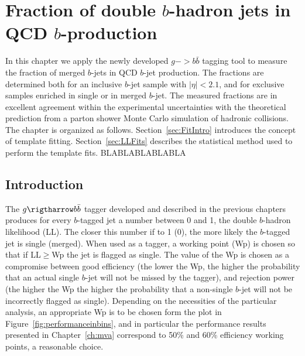 %
\chapter{Fraction of double $b$-hadron jets in QCD $b$-production}\label{ch:gbbfraction}


In this chapter we apply the newly developed $g->b\bar{b}$ tagging tool to measure the fraction of merged $b$-jets in QCD $b$-jet production. The fractions are determined both for an inclusive $b$-jet sample with $|\eta|<2.1$, and for exclusive samples enriched in single or in merged $b$-jet.
The measured fractions are in excellent agreement within the experimental uncertainties with the theoretical prediction from a parton shower Monte Carlo simulation of hadronic collisions.
The chapter is organized as follows. Section~\ref{sec:FitIntro} introduces the concept of template fitting. Section~\ref{sec:LLFits} describes the statistical method used to perform the template fits.
BLABLABLABLABLA

\section{Introduction}

The $g\rigtharrow b\bar{b}$ tagger developed and described in the previous chapters produces for every $b$-tagged jet a number between 0 and 1, the double $b$-hadron likelihood (LL). The closer this number if to 1 (0), the more likely the $b$-tagged jet is single (merged). When used as a tagger, a working point (Wp) is chosen so that if LL$\geq$Wp the jet is flagged as single. The value of the Wp is chosen as a compromise between good efficiency (the lower the Wp, the higher the probability that an actual single $b$-jet will not be missed by the tagger), and rejection power (the higher the Wp the higher the probability that a non-single $b$-jet will not be incorrectly flagged as single). Depending on the necessities of the particular analysis, an appropriate Wp is to be chosen form the plot in Figure~\ref{fig:performanceinbins}, and in particular the performance results presented in Chapter~\ref{ch:mva} correspond to 50\% and 60\% efficiency working points, a reasonable choice.


